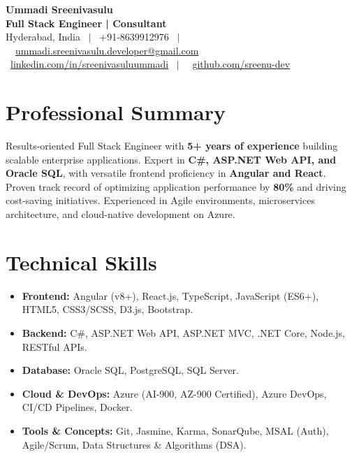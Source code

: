 \documentclass[a4paper,10pt]{article}
\begin{document}
\begin{center}
    {\Huge \textbf{Ummadi Sreenivasulu}} \\ [4pt]
    \textbf{Full Stack Engineer | Consultant} \\ [4pt]
    \small
    \faMapMarker* Hyderabad, India \ $|$ \ 
    \faPhone* +91-8639912976 \ $|$ \ 
    \faEnvelope \ \href{mailto:ummadi.sreenivasulu.developer@gmail.com}{ummadi.sreenivasulu.developer@gmail.com} \\ [4pt]
    \faLinkedin \ \href{https://www.linkedin.com/in/sreenivasuluummadi/}{linkedin.com/in/sreenivasuluummadi} \ $|$ \ 
    \faGithub \ \href{https://github.com/sreenu-dev}{github.com/sreenu-dev}
\end{center}

\section{Professional Summary}
Results-oriented Full Stack Engineer with \textbf{5+ years of experience} building scalable enterprise applications. Expert in \textbf{C\#, ASP.NET Web API, and Oracle SQL}, with versatile frontend proficiency in \textbf{Angular and React}. Proven track record of optimizing application performance by \textbf{80\%} and driving cost-saving initiatives. Experienced in Agile environments, microservices architecture, and cloud-native development on Azure.

\section{Technical Skills}
\begin{itemize}[leftmargin=*, noitemsep]
    \item \textbf{Frontend:} Angular (v8+), React.js, TypeScript, JavaScript (ES6+), HTML5, CSS3/SCSS, D3.js, Bootstrap.
    \item \textbf{Backend:} C\#, ASP.NET Web API, ASP.NET MVC, .NET Core, Node.js, RESTful APIs.
    \item \textbf{Database:} Oracle SQL, PostgreSQL, SQL Server.
    \item \textbf{Cloud \& DevOps:} Azure (AI-900, AZ-900 Certified), Azure DevOps, CI/CD Pipelines, Docker.
    \item \textbf{Tools \& Concepts:} Git, Jasmine, Karma, SonarQube, MSAL (Auth), Agile/Scrum, Data Structures \& Algorithms (DSA).
\end{itemize}
\end{document}
